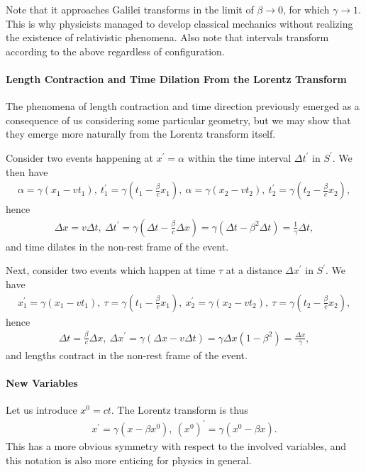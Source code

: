 Note that it approaches Galilei transforms in the limit of $\beta\to 0$, for which $\gamma\to 1$. This is why physicists managed to develop classical mechanics without realizing the existence of relativistic phenomena. Also note that intervals transform according to the above regardless of configuration.

\paragraph{Length Contraction and Time Dilation From the Lorentz Transform}
The phenomena of length contraction and time direction previously emerged as a consequence of us considering some particular geometry, but we may show that they emerge more naturally from the Lorentz transform itself.

Consider two events happening at $x^{\prime} = \alpha$ within the time interval $\Delta t^{\prime}$ in $S^{\prime}$. We then have
\begin{align*}
	\alpha = \gamma(x_{1} - vt_{1}),\ t_{1}^{\prime} = \gamma\left(t_{1} - \frac{\beta}{c}x_{1}\right),\ \alpha = \gamma(x_{2} - vt_{2}),\ t_{2}^{\prime} = \gamma\left(t_{2} - \frac{\beta}{c}x_{2}\right),
\end{align*}
hence
\begin{align*}
	\Delta x = v\Delta t,\ \Delta t^{\prime} = \gamma\left(\Delta t - \frac{\beta}{c}\Delta x\right) = \gamma\left(\Delta t - \beta^{2}\Delta t\right) = \frac{1}{\gamma}\Delta t,
\end{align*}
and time dilates in the non-rest frame of the event.

Next, consider two events which happen at time $\tau$ at a distance $\Delta x^{\prime}$ in $S^{\prime}$. We have
\begin{align*}
	x_{1}^{\prime} = \gamma(x_{1} - vt_{1}),\ \tau = \gamma\left(t_{1} - \frac{\beta}{c}x_{1}\right),\ x_{2}^{\prime} = \gamma(x_{2} - vt_{2}),\ \tau = \gamma\left(t_{2} - \frac{\beta}{c}x_{2}\right),
\end{align*}
hence
\begin{align*}
	\Delta t = \frac{\beta}{c}\Delta x,\ \Delta x^{\prime} = \gamma(\Delta x - v\Delta t) = \gamma\Delta x(1 - \beta^{2}) = \frac{\Delta x}{\gamma},
\end{align*}
and lengths contract in the non-rest frame of the event.

\paragraph{New Variables}
Let us introduce $x^{0} = ct$. The Lorentz transform is thus
\begin{align*}
	x^{\prime} = \gamma(x - \beta x^{0}),\ (x^{0})^{\prime} = \gamma\left(x^{0} - \beta x\right).
\end{align*}
This has a more obvious symmetry with respect to the involved variables, and this notation is also more enticing for physics in general.

